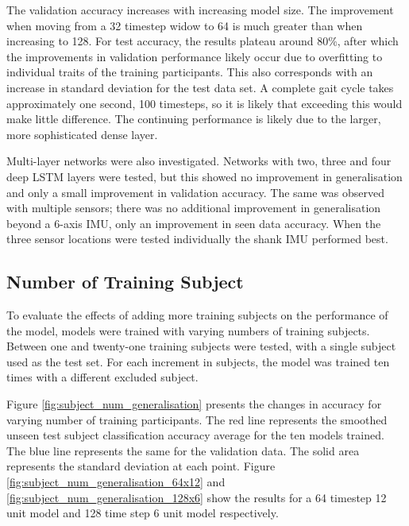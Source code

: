 \documentclass[sensors,article,submit,moreauthors,pdftex]{Definitions/mdpi}
\begin{document}
The validation accuracy increases with increasing model size. The improvement when moving from a 32 timestep widow to 64 is much greater than when increasing to 128. For test accuracy, the results plateau around 80\%, after which the improvements in validation performance likely occur due to overfitting to individual traits of the training participants. This also corresponds with an increase in standard deviation for the test data set. A complete gait cycle takes approximately one second, 100 timesteps, so it is likely that exceeding this would make little difference. The continuing performance is likely due to the larger, more sophisticated dense layer.

Multi-layer networks were also investigated. Networks with two, three and four deep LSTM layers were tested, but this showed no improvement in generalisation and only a small improvement in validation accuracy. The same was observed with multiple sensors; there was no additional improvement in generalisation beyond a 6-axis IMU, only an improvement in seen data accuracy. When the three sensor locations were tested individually the shank IMU performed best.

\subsection{Number of Training Subject}

To evaluate the effects of adding more training subjects on the performance of the model, models were trained with varying numbers of training subjects. Between one and twenty-one training subjects were tested, with a single subject used as the test set. For each increment in subjects, the model was trained ten times with a different excluded subject.

Figure \ref{fig:subject_num_generalisation} presents the changes in accuracy for varying number of training participants. The red line represents the smoothed unseen test subject classification accuracy average for the ten models trained. The blue line represents the same for the validation data. The solid area represents the standard deviation at each point. Figure \ref{fig:subject_num_generalisation_64x12} and \ref{fig:subject_num_generalisation_128x6} show the results for a 64 timestep 12 unit model and 128 time step 6 unit model respectively.
\end{document}
